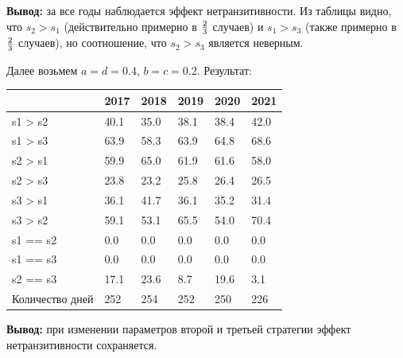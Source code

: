 \textbf{Вывод:} за все годы наблюдается эффект нетранзитивности. Из таблицы видно, что $s_2 > s_1$ (действительно примерно в $2 \over 3$ случаев) и  $s_1 > s_3$ (также примерно в $2 \over 3$ случаев), но соотношение, что $s_2 > s_3$  является неверным.
\smallskip
\smallskip

 Далее возьмем $a = d = 0.4$, $b = c = 0.2$. Результат:
 \begin{table}[!ht]
    \centering
    \begin{tabular}{|l|l|l|l|l|l|}
    \hline
         & 2017 & 2018 & 2019 & 2020 & 2021 \\ \hline
        s1 > s2 & 40.1 & 35.0 & 38.1 & 38.4 & 42.0 \\ \hline
        \rowcolor{blue}s1 > s3 & 63.9 & 58.3 & 63.9 & 64.8 & 68.6 \\ \hline
        \rowcolor{blue}s2 > s1 & 59.9 & 65.0 & 61.9 & 61.6 & 58.0 \\ \hline
        s2 > s3 & 23.8 & 23.2 & 25.8 & 26.4 & 26.5 \\ \hline
        s3 > s1 & 36.1 & 41.7 & 36.1 & 35.2 & 31.4 \\ \hline
        \rowcolor{blue}s3 > s2 & 59.1 & 53.1 & 65.5 & 54.0 & 70.4 \\ \hline
        s1 == s2 & 0.0 & 0.0 & 0.0 & 0.0 & 0.0 \\ \hline
        s1 == s3 & 0.0 & 0.0 & 0.0 & 0.0 & 0.0 \\ \hline
        s2 == s3 & 17.1 & 23.6 & 8.7 & 19.6 & 3.1 \\ \hline
        Количество дней & 252 & 254 & 252 & 250 & 226 \\ \hline
    \end{tabular}
\end{table}

\textbf{Вывод:} при изменении параметров второй и третьей стратегии эффект нетранзитивности сохраняется.
\smallskip
\smallskip

